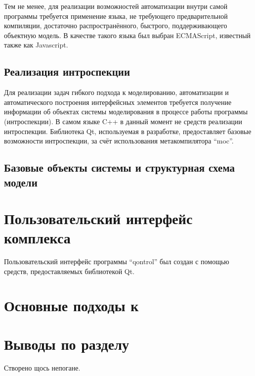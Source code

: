 Тем не менее, для реализации возможностей автоматизации
внутри самой программы требуется применение языка,
не требующего предварительной компиляции, достаточно распространённого,
быстрого, поддерживающего объектную модель.
В качестве такого языка был выбран ECMAScript, известный также
как Javascript.

\subsection{Реализация интроспекции}

Для реализации задач гибкого подхода к моделированию, автоматизации
и автоматического построения интерфейсных элементов
требуется получение информации об объектах системы моделирования
в процессе работы программы (интроспекции).
В самом языке C++ в данный момент не средств реализации интроспекции.
Библиотека Qt, используемая в разработке, предоставляет
базовые возможности интроспекции, за счёт использования метакомпилятора ``moc''.

\subsection{Базовые объекты системы и структурная схема модели}



\section{Пользовательский интерфейс комплекса} %

Пользовательский интерфейс программы ``qontrol'' был создан с помощью
средств, предоставляемых библиотекой Qt.

\section{Основные подходы к } %

\section{Выводы по разделу} %

Створено щось непогане.

